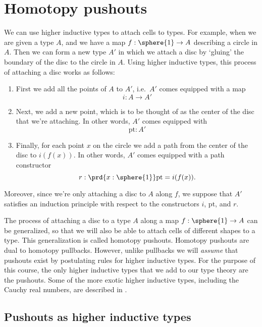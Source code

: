 \chapter{Homotopy pushouts}

We can use higher inductive types to attach cells to types.
For example, when we are given a type $A$, and we have a map $f:\sphere{1}\to A$ describing a circle in $A$.
Then we can form a new type $A'$ in which we attach a disc by `gluing' the boundary of the disc to the circle in $A$.
Using higher inductive types, this process of attaching a disc works as follows:
\begin{enumerate}
\item First we add all the points of $A$ to $A'$, i.e.~$A'$ comes equipped with a map
\begin{equation*}
i : A \to A'
\end{equation*}
\item Next, we add a new point, which is to be thought of as the center of the disc that we're attaching. In other words, $A'$ comes equipped with
\begin{equation*}
\mathrm{pt} : A'
\end{equation*}
\item Finally, for each point $x$ on the circle we add a path from the center of the disc to $i(f(x))$. In other words, $A'$ comes equipped with a path constructor
\begin{equation*}
r:\prd{x:\sphere{1}} \mathrm{pt}=i(f(x)).
\end{equation*}
\end{enumerate}
Moreover, since we're only attaching a disc to $A$ along $f$, we suppose that $A'$ satisfies an induction principle with respect to the constructors $i$, $\mathrm{pt}$, and $r$. 

The process of attaching a disc to a type $A$ along a map $f:\sphere{1}\to A$ can be generalized, so that we will also be able to attach cells of different shapes to a type. This generalization is called homotopy pushouts. Homotopy pushouts are dual to homotopy pullbacks. However, unlike pullbacks we will \emph{assume} that pushouts exist by postulating rules for higher inductive types. For the purpose of this course, the only higher inductive types that we add to our type theory are the pushouts. Some of the more exotic higher inductive types, including the Cauchy real numbers, are described in \cite{hottbook}.

\section{Pushouts as higher inductive types}

